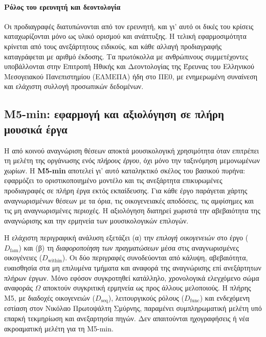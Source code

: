 \documentclass[a4paper]{article}
\begin{document}
\paragraph{Ρόλος του ερευνητή και δεοντολογία}
Οι προδιαγραφές διατυπώνονται από τον ερευνητή, και γι' αυτό οι δικές του κρίσεις καταχωρίζονται μόνο ως υλικό ορισμού και ανάπτυξης. Η τελική εφαρμοσιμότητα κρίνεται από τους ανεξάρτητους ειδικούς, και κάθε αλλαγή προδιαγραφής καταγράφεται με αριθμό έκδοσης. Τα πρωτόκολλα με ανθρώπινους συμμετέχοντες υποβάλλονται στην Επιτροπή Ηθικής και Δεοντολογίας της Έρευνας του Ελληνικού Μεσογειακού Πανεπιστημίου (ΕΛΜΕΠΑ) ήδη στο ΠΕ0, με ενημερωμένη συναίνεση και ελάχιστη συλλογή προσωπικών δεδομένων.



\subsection{Μ5-min: εφαρμογή και αξιολόγηση σε πλήρη μουσικά έργα}\label{sec:m5min}
Η από κοινού αναγνώριση θέσεων αποκτά μουσικολογική χρησιμότητα όταν επιτρέπει τη μελέτη της οργάνωσης ενός \emph{πλήρους έργου}, όχι μόνο την ταξινόμηση μεμονωμένων χωρίων. Η \textbf{Μ5-min} αποτελεί γι' αυτό καταληκτικό σκέλος του βασικού πυρήνα: εφαρμόζει το οριστικοποιημένο μοντέλο και τις ανεξάρτητα επικυρωμένες προδιαγραφές σε πλήρη έργα εκτός εκπαίδευσης. Για κάθε έργο παράγεται χάρτης αναγνωρισμένων θέσεων με τα όρια, τις οικογενειακές αποδόσεις, τις αμφίσημες και τις μη αναγνωρισμένες περιοχές. Η αξιολόγηση διατηρεί χωριστά την αβεβαιότητα της αναγνώρισης και την ερμηνεία των μουσικολογικών επιλογών.

Η ελάχιστη περιγραφική ανάλυση εξετάζει (α) την \emph{επιλογή οικογενειών} στο έργο ($D_{\mathrm{fam}}$) και (β) τη \emph{διαφοροποίηση των πραγματώσεων} μέσα στις αναγνωρισμένες οικογένειες ($D_{\mathrm{within}}$). Οι δύο περιγραφές συνοδεύονται από κάλυψη, αβεβαιότητα, ευαισθησία στα μη επιλυμένα τμήματα και αναφορά της αναγνώρισης επί ανεξάρτητων πλήρων έργων. Μόνο εφόσον συγκροτηθεί κατάλληλο, χρονολογικά ελεγχόμενο σώμα αναφοράς $\Omega$ αποκτούν συγκριτική ερμηνεία ως προς άλλους μελοποιούς. Η πλήρης Μ5, με διαδοχές οικογενειών ($D_{\mathrm{seq}}$), λειτουργικούς ρόλους ($D_{\mathrm{func}}$) και ενδεχόμενη εστίαση στον Νικόλαο Πρωτοψάλτη Σμύρνης, παραμένει συμπληρωματική μελέτη υπό επαρκή τεκμηρίωση και ανεξαρτησία πηγών. Δεν απαιτούνται ηχογραφήσεις ή νέα ακροαματική μελέτη για τη Μ5-min.

\end{document}
